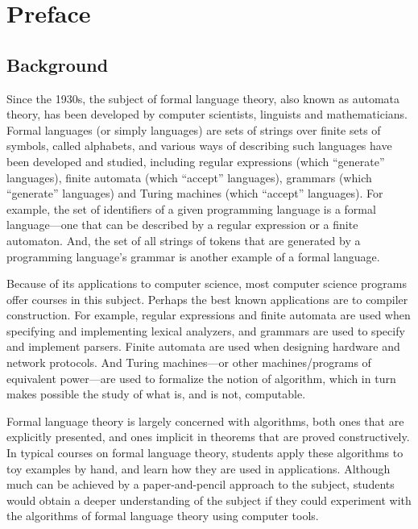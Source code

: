 \chapter*{Preface}

\section*{Background}
\label{Background}

Since the 1930s, the subject of formal language theory, also known as
automata theory, has been developed by computer scientists, linguists
and mathematicians.  Formal languages (or simply languages) are sets
of strings over finite sets of symbols, called alphabets, and various
ways of describing such languages have been developed and studied,
including regular expressions (which ``generate'' languages), finite
automata (which ``accept'' languages), grammars (which ``generate''
languages) and Turing machines (which ``accept'' languages).  For
example, the set of identifiers of a given programming language is a
formal language---one that can be described by a regular expression or
a finite automaton.  And, the set of all strings of tokens that are
generated by a programming language's grammar is another example of a
formal language.

Because of its applications to computer science, most computer science
programs offer courses in this subject.  Perhaps the best known
applications are to compiler construction.  For example, regular
expressions and finite automata are used when specifying and
implementing lexical analyzers, and grammars are used to specify and
implement parsers.  Finite automata are used when designing hardware
and network protocols.  And Turing machines---or other
machines/programs of equivalent power---are used to formalize the
notion of algorithm, which in turn makes possible the study of what
is, and is not, computable.

Formal language theory is largely concerned with algorithms, both ones
that are explicitly presented, and ones implicit in theorems that are
proved constructively.  In typical courses on formal language theory,
students apply these algorithms to toy examples by hand, and learn how
they are used in applications.  Although much can be achieved by a
paper-and-pencil approach to the subject, students would obtain a
deeper understanding of the subject if they could experiment with the
algorithms of formal language theory using computer tools.

